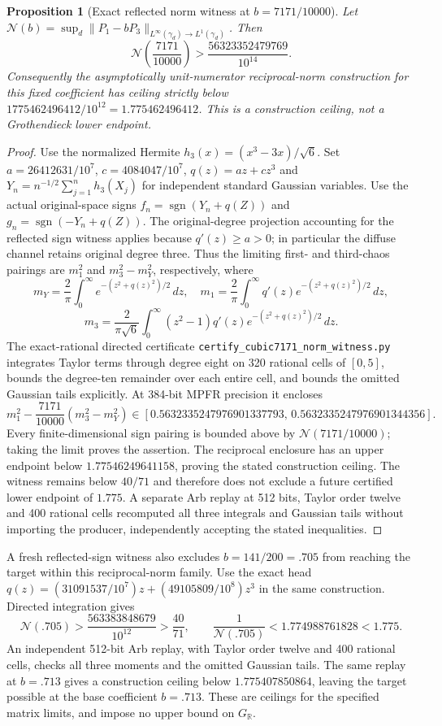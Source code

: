 \documentclass[11pt]{article}
\newcommand{\N}{\mathcal N}
\newtheorem{proposition}[theorem]{Proposition}
\begin{document}
\begin{proposition}[Exact reflected norm witness at $b=7171/10000$]
Let $\N(b)=\sup_d\|P_1-bP_3\|_{L^\infty(\gamma_d)\to L^1(\gamma_d)}$.
Then
\[
 \N\left(\frac{7171}{10000}\right)
 >\frac{56323352479769}{10^{14}}.
\]
Consequently the asymptotically unit-numerator reciprocal-norm construction
for this fixed coefficient has ceiling strictly below
$1775462496412/10^{12}=1.775462496412$.
This is a construction ceiling, not a Grothendieck lower endpoint.
\end{proposition}
\begin{proof}
Use the normalized Hermite $h_3(x)=(x^3-3x)/\sqrt6$. Set $a=26412631/10^7$, $c=4084047/10^7$, $q(z)=az+cz^3$ and
$Y_n=n^{-1/2}\sum_{j=1}^nh_3(X_j)$ for independent standard Gaussian variables.
Use the actual original-space signs
$f_n=\operatorname{sgn}(Y_n+q(Z))$ and
$g_n=\operatorname{sgn}(-Y_n+q(Z))$.
The original-degree projection accounting for the reflected sign witness
applies because $q'(z)\ge a>0$; in particular the diffuse channel retains
original degree three.  Thus the limiting first- and third-chaos pairings are
$m_1^2$ and $m_3^2-m_Y^2$, respectively, where
\[
 m_Y=\frac2\pi\int_0^\infty e^{-(z^2+q(z)^2)/2}\,dz,
\quad
 m_1=\frac2\pi\int_0^\infty q'(z)e^{-(z^2+q(z)^2)/2}\,dz,
\]
\[
 m_3=\frac2{\pi\sqrt6}\int_0^\infty(z^2-1)q'(z)
                       e^{-(z^2+q(z)^2)/2}\,dz.
\]
The exact-rational directed certificate
\texttt{certify\_\allowbreak cubic7171\_\allowbreak norm\_\allowbreak witness.py}
integrates Taylor terms through degree eight on 320 rational cells of $[0,5]$,
bounds the degree-ten remainder over each entire cell, and bounds the omitted
Gaussian tails explicitly.  At 384-bit MPFR precision it encloses
\[
 m_1^2-\frac{7171}{10000}(m_3^2-m_Y^2)
 \in[0.5632335247976901337793,\,0.5632335247976901344356].
\]
Every finite-dimensional sign pairing is bounded above by $\N(7171/10000)$;
taking the limit proves the assertion.  The reciprocal enclosure has an upper
endpoint below $1.77546249641158$, proving the stated
construction ceiling.  The witness remains below $40/71$ and therefore
does not exclude a future certified lower endpoint of $1.775$.
A separate Arb replay at 512 bits, Taylor order twelve and 400 rational cells
recomputed all three integrals and Gaussian tails without importing the
producer, independently accepting the stated inequalities.
\end{proof}

A fresh reflected-sign witness also excludes $b=141/200=.705$ from
reaching the target within this reciprocal-norm family. Use the exact head
$q(z)=(31091537/10^7)z+(49105809/10^8)z^3$ in the same construction.
Directed integration gives
\[
 \N(.705)>\frac{563383848679}{10^{12}}>\frac{40}{71},
 \qquad \frac1{\N(.705)}<1.774988761828<1.775.
\]
An independent 512-bit Arb replay, with Taylor order twelve and 400
rational cells, checks all three moments and the omitted Gaussian tails.
The same replay at $b=.713$ gives a construction ceiling below
$1.775407850864$, leaving the target possible at the base coefficient $b=.713$. These are ceilings for the specified matrix
limits, and impose no upper bound on $G_{\mathbb R}$.
\end{document}
